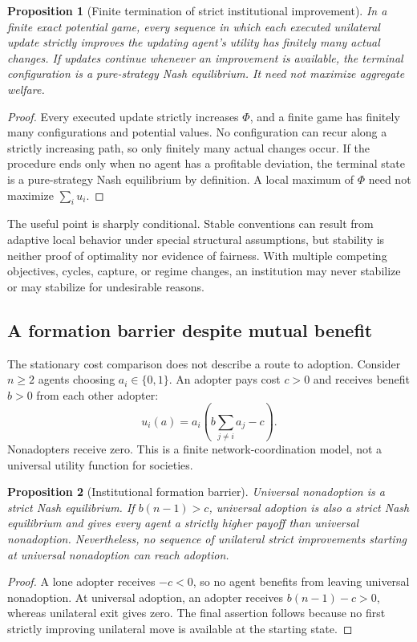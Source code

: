 \documentclass[11pt,letterpaper]{article}
\theoremstyle{plain}
\newtheorem{proposition}{Proposition}[section]
\theoremstyle{definition}
\theoremstyle{remark}
\begin{document}
\begin{proposition}[Finite termination of strict institutional improvement]\label{prop:potential}
In a finite exact potential game, every sequence in which each executed unilateral update strictly improves the updating agent's utility has finitely many actual changes. If updates continue whenever an improvement is available, the terminal configuration is a pure-strategy Nash equilibrium. It need not maximize aggregate welfare.
\end{proposition}
\begin{proof}
Every executed update strictly increases $\Phi$, and a finite game has finitely many configurations and potential values. No configuration can recur along a strictly increasing path, so only finitely many actual changes occur. If the procedure ends only when no agent has a profitable deviation, the terminal state is a pure-strategy Nash equilibrium by definition. A local maximum of $\Phi$ need not maximize $\sum_i u_i$.
\end{proof}

The useful point is sharply conditional. Stable conventions can result from adaptive local behavior under special structural assumptions, but stability is neither proof of optimality nor evidence of fairness. With multiple competing objectives, cycles, capture, or regime changes, an institution may never stabilize or may stabilize for undesirable reasons.


\subsection{A formation barrier despite mutual benefit}
The stationary cost comparison does not describe a route to adoption. Consider $n\geq2$ agents choosing $a_i\in\{0,1\}$. An adopter pays cost $c>0$ and receives benefit $b>0$ from each other adopter:
\[
u_i(a)=a_i\left(b\sum_{j\ne i}a_j-c\right).
\]
Nonadopters receive zero. This is a finite network-coordination model, not a universal utility function for societies.

\begin{proposition}[Institutional formation barrier]\label{prop:barrier}
Universal nonadoption is a strict Nash equilibrium. If $b(n-1)>c$, universal adoption is also a strict Nash equilibrium and gives every agent a strictly higher payoff than universal nonadoption. Nevertheless, no sequence of unilateral strict improvements starting at universal nonadoption can reach adoption.
\end{proposition}
\begin{proof}
A lone adopter receives $-c<0$, so no agent benefits from leaving universal nonadoption. At universal adoption, an adopter receives $b(n-1)-c>0$, whereas unilateral exit gives zero. The final assertion follows because no first strictly improving unilateral move is available at the starting state.
\end{proof}
\end{document}
